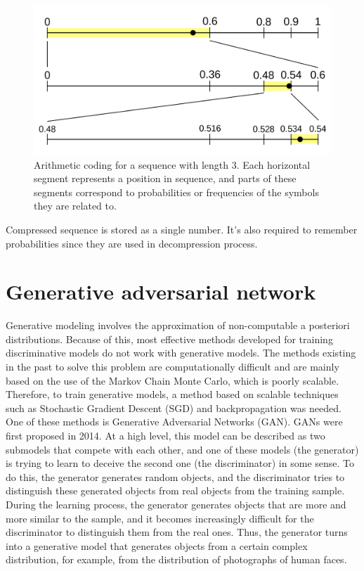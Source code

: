 \begin{figure}[!ht]
    \centering
    \includegraphics[width=\textwidth]{figure/Arithmetic_encoding.svg.png}
    \caption{Arithmetic coding for a sequence with length 3. Each horizontal segment represents a position in sequence, and parts of these segments correspond to probabilities or frequencies of the symbols they are related to.}
    \label{arithmetic_coding}
\end{figure}

Compressed sequence is stored as a single number. It's also required to remember probabilities since they are used in decompression process.

\section{Generative adversarial network}

Generative modeling involves the approximation of non-computable a posteriori distributions. Because of this, most effective methods developed for training discriminative models do not work with generative models. The methods existing in the past to solve this problem are computationally difficult and are mainly based on the use of the Markov Chain Monte Carlo, which is poorly scalable. Therefore, to train generative models, a method based on scalable techniques such as Stochastic Gradient Descent (SGD) and backpropagation was needed. One of these methods is Generative Adversarial Networks (GAN). GANs were first proposed in 2014. At a high level, this model can be described as two submodels that compete with each other, and one of these models (the generator) is trying to learn to deceive the second one (the discriminator) in some sense. To do this, the generator generates random objects, and the discriminator tries to distinguish these generated objects from real objects from the training sample. During the learning process, the generator generates objects that are more and more similar to the sample, and it becomes increasingly difficult for the discriminator to distinguish them from the real ones. Thus, the generator turns into a generative model that generates objects from a certain complex distribution, for example, from the distribution of photographs of human faces.

